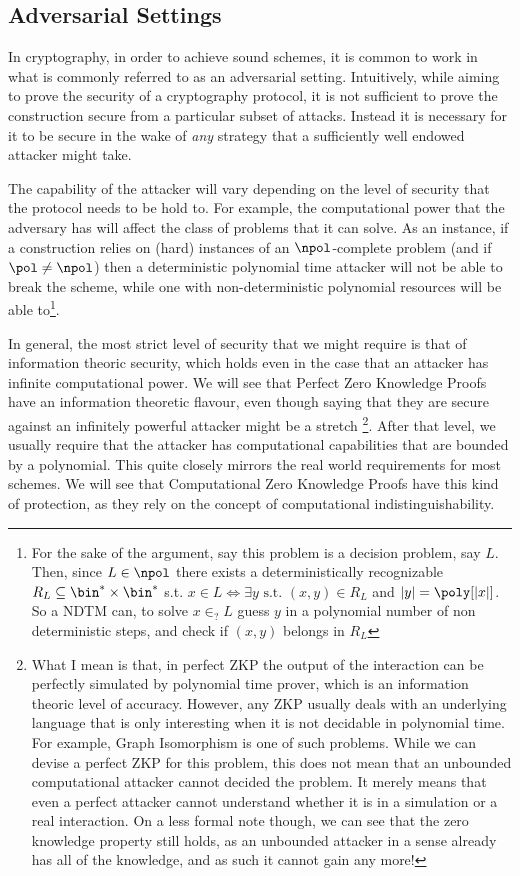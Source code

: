 \documentclass{article}
\begin{document}
\subsection{Adversarial Settings}
In cryptography, in order to achieve sound schemes, it is common to work in what is commonly referred to as an adversarial setting.
Intuitively, while aiming to prove the security of a cryptography protocol, it is not sufficient to prove the construction secure from a particular subset of attacks. Instead it is necessary for it to be secure in the wake of \textit{any} strategy that a sufficiently well endowed attacker might take. \par

The capability of the attacker will vary depending on the level of security that the protocol needs to be hold to. For example, the computational power that the adversary has will affect the class of problems that it can solve.
As an instance, if a construction relies on (hard) instances of an $\npol$-complete problem (and if $\pol \neq \npol$) then a deterministic polynomial time attacker will not be able to break the scheme, while one with non-deterministic polynomial resources will be able to\footnote{For the sake of the argument, say this problem is a decision problem, say $L$. Then, since $L \in \npol$ there exists a deterministically recognizable $R_L \subseteq \bin^* \times \bin^* $ s.t. $x \in L \iff \exists y \text{ s.t. } (x, y) \in R_L$ and $|y| = \poly[|x|]$. So a NDTM can, to solve $x \in_? L$ guess $y$ in a polynomial number of non deterministic steps, and check if $(x, y)$ belongs in $R_L$ }.

In general, the most strict level of security that we might require is that of information theoric security, which holds even in the case that
an attacker has infinite computational power. We will see that Perfect Zero Knowledge Proofs have an information theoretic flavour, even
though saying that they are secure against an infinitely powerful attacker might be a stretch
\footnote{What I mean is that, in perfect ZKP the output of the interaction can be perfectly simulated by polynomial time prover, which is
    an information theoric level of accuracy. However, any ZKP usually deals with an underlying language that is only interesting when it is not
    decidable in polynomial time. For example, Graph Isomorphism is one of such problems. While we can devise a perfect ZKP for this problem, this
    does not mean that an unbounded computational attacker cannot decided the problem. It merely means that even a perfect attacker cannot
    understand whether it is in a simulation or a real interaction. On a less formal note though, we can see that the zero knowledge
    property still holds, as an unbounded attacker in a sense already has all of the knowledge, and as such it cannot gain any more!}.
After that level, we usually require that the attacker has computational capabilities that are bounded by a polynomial.
This quite closely mirrors the real world requirements for most schemes. We will see that Computational Zero Knowledge Proofs
have this kind of protection, as they rely on the concept of computational indistinguishability.
\end{document}
